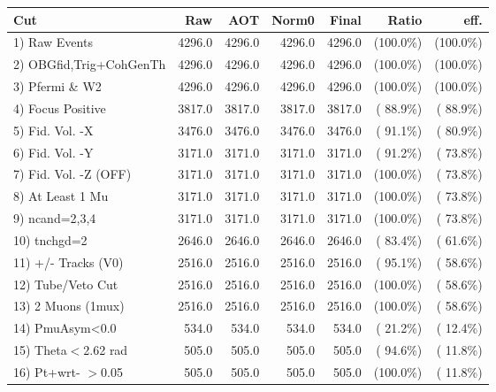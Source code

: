  \begin{table}[h!]\centering
 \begin{tabular}{||l||r|r|r|r|r|r||}
 \hline
 \hline
 Cut & Raw & AOT & Norm0 & Final & Ratio & eff.       \\
 \hline
  1) Raw Events           &       4296.0 &       4296.0 &       4296.0 &       4296.0 & (100.0\%) & (100.0\%) \\
  2) OBGfid,Trig+CohGenTh &       4296.0 &       4296.0 &       4296.0 &       4296.0 & (100.0\%) & (100.0\%) \\
  3) Pfermi \& W2         &       4296.0 &       4296.0 &       4296.0 &       4296.0 & (100.0\%) & (100.0\%) \\
  4) Focus Positive       &       3817.0 &       3817.0 &       3817.0 &       3817.0 & ( 88.9\%) & ( 88.9\%) \\
  5) Fid. Vol. -X         &       3476.0 &       3476.0 &       3476.0 &       3476.0 & ( 91.1\%) & ( 80.9\%) \\
  6) Fid. Vol. -Y         &       3171.0 &       3171.0 &       3171.0 &       3171.0 & ( 91.2\%) & ( 73.8\%) \\
  7) Fid. Vol. -Z (OFF)   &       3171.0 &       3171.0 &       3171.0 &       3171.0 & (100.0\%) & ( 73.8\%) \\
  8) At Least 1 Mu        &       3171.0 &       3171.0 &       3171.0 &       3171.0 & (100.0\%) & ( 73.8\%) \\
  9) ncand=2,3,4          &       3171.0 &       3171.0 &       3171.0 &       3171.0 & (100.0\%) & ( 73.8\%) \\
 10) tnchgd=2             &       2646.0 &       2646.0 &       2646.0 &       2646.0 & ( 83.4\%) & ( 61.6\%) \\
 11) +/- Tracks (V0)      &       2516.0 &       2516.0 &       2516.0 &       2516.0 & ( 95.1\%) & ( 58.6\%) \\
 12) Tube/Veto Cut        &       2516.0 &       2516.0 &       2516.0 &       2516.0 & (100.0\%) & ( 58.6\%) \\
 13) 2 Muons (1mux)       &       2516.0 &       2516.0 &       2516.0 &       2516.0 & (100.0\%) & ( 58.6\%) \\
 14) PmuAsym<0.0          &        534.0 &        534.0 &        534.0 &        534.0 & ( 21.2\%) & ( 12.4\%) \\
 15) Theta$<$2.62 rad     &        505.0 &        505.0 &        505.0 &        505.0 & ( 94.6\%) & ( 11.8\%) \\
 16) Pt+wrt- $>$0.05      &        505.0 &        505.0 &        505.0 &        505.0 & (100.0\%) & ( 11.8\%) \\

\end{tabular}
\end{table}
